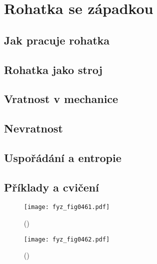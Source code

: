 \setchaptertoc
\chapter{Rohatka se západkou}\label{fyz:IchapXLVI}

  \section{Jak pracuje rohatka}\label{fyz:IchapXLVIsecI}
  \section{Rohatka jako stroj}\label{fyz:IchapXLVIsecII}
  \section{Vratnost v mechanice}\label{fyz:IchapXLVIsecIII}
  \section{Nevratnost}\label{fyz:IchapXLVIsecIV}
  \section{Uspořádání a entropie}\label{fyz:IchapXLVIsecV}
  \section{Příklady a cvičení}\label{fyz:IchapXLVIsecVI}

    \begin{figure}[ht!] %
      \centering
      \texttt{[image: fyz\_fig0461.pdf]}
      \caption{ 
               (\cite[s.~707]{Feynman01})}
      \label{fyz:fig0461}
    \end{figure}

    \begin{figure}[ht!] %
      \centering
      \texttt{[image: fyz\_fig0462.pdf]}
      \caption{ 
               (\cite[s.~707]{Feynman01})}
      \label{fyz:fig0462}
    \end{figure}
